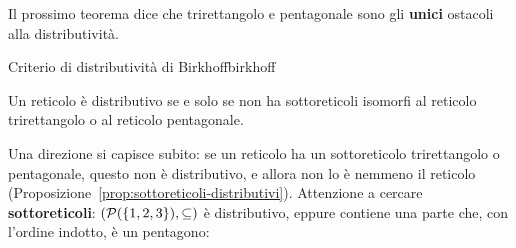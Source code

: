 Il prossimo teorema dice che trirettangolo e pentagonale sono gli \textbf{unici} ostacoli alla distributività.

\begin{concetto}
\begin{Teorema}{Criterio di distributività di Birkhoff}{birkhoff}
    \begin{prerequisiti}
    \end{prerequisiti}
    \senzadim
    Un reticolo è distributivo se e solo se non ha sottoreticoli isomorfi al reticolo trirettangolo o al reticolo pentagonale.
\end{Teorema}
\end{concetto}

\begin{spiegazione}
    Una direzione si capisce subito: se un reticolo ha un sottoreticolo trirettangolo o pentagonale, questo non è distributivo, e allora
    non lo è nemmeno il reticolo (Proposizione~\ref{prop:sottoreticoli-distributivi}). Attenzione a cercare \textbf{sottoreticoli}: $(\mathcal{P}(\{1, 2, 3\}), \subseteq)$ è distributivo, eppure
    contiene una parte che, con l'ordine indotto, è un pentagono:
    \begin{center}
    \end{center}
\end{spiegazione}

